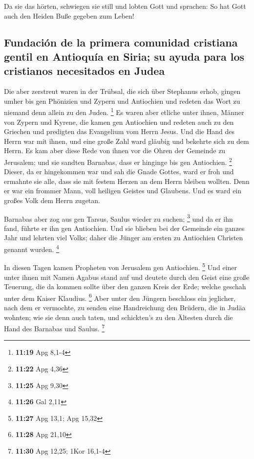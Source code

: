  Da sie das hörten, schwiegen sie still und lobten Gott
und sprachen: So hat Gott auch den Heiden Buße gegeben zum Leben!

\hypertarget{fundaciuxf3n-de-la-primera-comunidad-cristiana-gentil-en-antioquuxeda-en-siria-su-ayuda-para-los-cristianos-necesitados-en-judea}{%
\subsection{Fundación de la primera comunidad cristiana gentil en
Antioquía en Siria; su ayuda para los cristianos necesitados en
Judea}\label{fundaciuxf3n-de-la-primera-comunidad-cristiana-gentil-en-antioquuxeda-en-siria-su-ayuda-para-los-cristianos-necesitados-en-judea}}

 Die aber zerstreut waren in der Trübsal, die sich über
Stephanus erhob, gingen umher bis gen Phönizien und Zypern und
Antiochien und redeten das Wort zu niemand denn allein zu den Juden.
\footnote{\textbf{11:19} Apg 8,1-4}  Es waren aber
etliche unter ihnen, Männer von Zypern und Kyrene, die kamen gen
Antiochien und redeten auch zu den Griechen und predigten das Evangelium
vom Herrn Jesus.  Und die Hand des Herrn war mit ihnen,
und eine große Zahl ward gläubig und bekehrte sich zu dem Herrn.
 Es kam aber diese Rede von ihnen vor die Ohren der
Gemeinde zu Jerusalem; und sie sandten Barnabas, dass er hinginge bis
gen Antiochien. \footnote{\textbf{11:22} Apg 4,36} 
Dieser, da er hingekommen war und sah die Gnade Gottes, ward er froh und
ermahnte sie alle, dass sie mit festem Herzen an dem Herrn bleiben
wollten.  Denn er war ein frommer Mann, voll heiligen
Geistes und Glaubens. Und es ward ein großes Volk dem Herrn zugetan.

 Barnabas aber zog aus gen Tarsus, Saulus wieder zu
suchen; \footnote{\textbf{11:25} Apg 9,30}  und da er ihn
fand, führte er ihn gen Antiochien. Und sie blieben bei der Gemeinde ein
ganzes Jahr und lehrten viel Volks; daher die Jünger am ersten zu
Antiochien Christen genannt wurden. \footnote{\textbf{11:26} Gal 2,11}

 In diesen Tagen kamen Propheten von Jerusalem gen
Antiochien. \footnote{\textbf{11:27} Apg 13,1; Apg 15,32}
 Und einer unter ihnen mit Namen Agabus stand auf und
deutete durch den Geist eine große Teuerung, die da kommen sollte über
den ganzen Kreis der Erde; welche geschah unter dem Kaiser Klaudius.
\footnote{\textbf{11:28} Apg 21,10}  Aber unter den
Jüngern beschloss ein jeglicher, nach dem er vermochte, zu senden eine
Handreichung den Brüdern, die in Judäa wohnten;  wie sie
denn auch taten, und schickten's zu den Ältesten durch die Hand des
Barnabas und Saulus. \footnote{\textbf{11:30} Apg 12,25; 1Kor 16,1-4}

